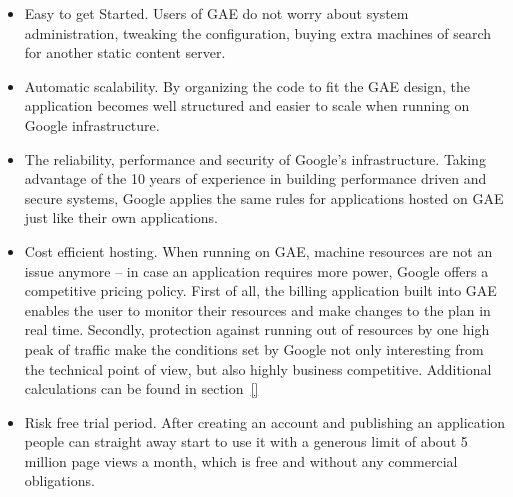 \begin{itemize}
\item{Easy to get Started. Users of GAE do not worry about system administration, tweaking the configuration, buying extra machines of search for another static content server.}
\item{Automatic scalability. By organizing the code to fit the GAE design, the application becomes well structured and easier to scale when running on Google infrastructure.} 
\item{The reliability, performance and security of Google's infrastructure. Taking advantage of the 10 years of experience in building performance driven and secure systems, Google applies the same rules for applications hosted on GAE just like their own applications.}
\item{Cost efficient hosting. When running on GAE, machine resources are not an issue anymore -- in case an application requires more power, Google offers a competitive pricing policy. First of all, the billing application built into GAE enables the user to monitor their resources and make changes to the plan in real time. Secondly, protection against running out of resources by one high peak of traffic make the conditions set by Google not only interesting from the technical point of view, but also highly business competitive. Additional calculations can be found in section~\ref{}}
\item{Risk free trial period. After creating an account and publishing an application people can straight away start to use it with a generous limit of about 5 million page views a month, which is free and without any commercial obligations.}
\end{itemize}

